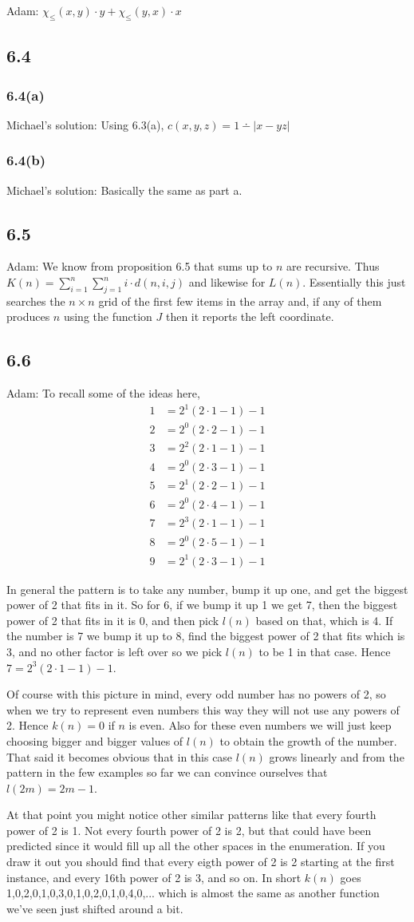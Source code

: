 \documentclass{article}
\renewcommand\ss{\subsection*}
\newcommand\sss{\subsubsection*}
\newcommand\ms{Michael's solution: } %
\begin{document}
Adam: $\chi_{\leq}(x,y)\cdot y + \chi_{\leq}(y,x)\cdot x$
\ss{6.4}
\sss{6.4(a)}
\ms Using 6.3(a), $c(x,y,z) = 1\dotminus |x-yz|$
\sss{6.4(b)}
\ms Basically the same as part a.
\ss{6.5} Adam: We know from proposition 6.5 that sums up to $n$ are recursive.  Thus
    $\displaystyle K(n) = \sum_{i=1}^n \sum_{j=1}^n i\cdot d(n,i,j)$ and likewise
    for $L(n)$.  Essentially this just searches the $n\times n$ grid of the first
    few items in the array and, if any of them produces $n$ using the function
    $J$ then it reports the left coordinate.
\ss{6.6} Adam: To recall some of the ideas here,
    \begin{align*}
      1&=2^1(2\cdot 1-1)-1\\
      2&=2^0(2\cdot 2-1)-1\\
      3&=2^2(2\cdot 1-1)-1\\
      4&=2^0(2\cdot 3-1)-1\\
      5&=2^1(2\cdot 2-1)-1\\
      6&=2^0(2\cdot 4-1)-1\\
      7&=2^3(2\cdot 1-1)-1\\
      8&=2^0(2\cdot 5-1)-1\\
      9&=2^1(2\cdot 3-1)-1
    \end{align*}

    In general the pattern is to take any number, bump it up one, and get
    the biggest power of 2 that fits in it.  So for 6, if we bump it up 1 we get
    7, then the biggest power of 2 that fits in it is 0, and then pick $l(n)$
    based on that, which is 4.  If the number is 7 we bump it up to 8, find the
    biggest power of 2 that fits which is 3, and no other factor is left over
    so we pick $l(n)$ to be 1 in that case.  Hence $7=2^3(2\cdot 1-1)-1$.

    Of course with this picture in mind, every odd number has no powers of 2,
    so when we try to represent even numbers this way they will not use any
    powers of 2.  Hence $k(n)=0$ if $n$ is even.  Also for these even numbers
    we will just keep choosing bigger and bigger values of $l(n)$ to obtain the
    growth of the number.  That said it becomes obvious that in this case $l(n)$
    grows linearly and from the pattern in the few examples so far we can
    convince ourselves that $l(2m)=2m-1$.

    At that point you might notice other similar patterns like that every fourth
    power of 2 is 1.  Not every fourth power of 2 is 2, but that could have
    been predicted since it would fill up all the other spaces in the enumeration.
    If you draw it out you should find that every eigth power of 2 is 2 starting
    at the first instance, and every 16th power of 2 is 3, and so on.  In short
    $k(n)$ goes 1,0,2,0,1,0,3,0,1,0,2,0,1,0,4,0,... which is almost the same as
    another function we've seen just shifted around a bit.
\end{document}
